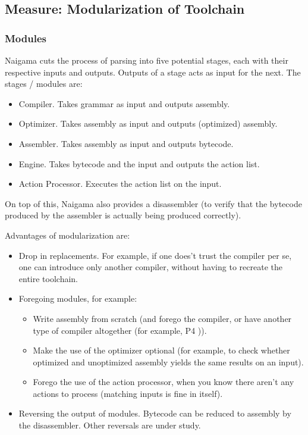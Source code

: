 \subsection{Measure: Modularization of Toolchain}

\subsubsection{Modules}
Naigama cuts the process of parsing into five potential stages, each with
their respective inputs and outputs. Outputs of a stage acts as input
for the next. The stages / modules are:

\begin{itemize}
\item{Compiler. Takes grammar as input and outputs assembly.}
\item{Optimizer. Takes assembly as input and outputs (optimized) assembly.}
\item{Assembler. Takes assembly as input and outputs bytecode.}
\item{Engine. Takes bytecode and the input and outputs the action list.}
\item{Action Processor. Executes the action list on the input.}
\end{itemize}

On top of this, Naigama also provides a disassembler (to verify that
the bytecode produced by the assembler is actually being produced correctly).

Advantages of modularization are:

\begin{itemize}
\item{Drop in replacements. For example, if one does't trust the compiler
      per se, one can introduce only another compiler, without having to
      recreate the entire toolchain.}
\item{Foregoing modules, for example:}
  \begin{itemize}
  \item{Write assembly from scratch (and forego the compiler, or have
        another type of compiler altogether (for example, P4 \cite{bib:p4})).}
  \item{Make the use of the optimizer optional (for example, to check
        whether optimized and unoptimized assembly yields the same results
        on an input).}
  \item{Forego the use of the action processor, when you know there aren't
        any actions to process (matching inputs is fine in itself).}
  \end{itemize}
\item{Reversing the output of modules. Bytecode can be reduced to assembly
      by the disassembler. Other reversals are under study.}
\end{itemize}

